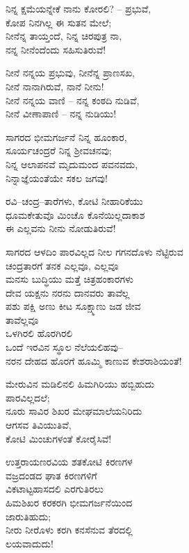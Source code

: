 ನಿನ್ನ ಕ್ಷಮೆಯನ್ನೇಕೆ ನಾನು ಕೋರಲಿ? – ಪ್ರಭುವೆ,\\ಕೋಪ ನಿನಗಿಲ್ಲ ಈ ಸುತನ ಮೇಲೆ;\\ನೀನೆನ್ನ ತಾಯ್ತಂದೆ, ನಿನ್ನ ಚಿರಪುತ್ರ ನಾ,\\ನನ್ನ ನೀನೆಂದೆಂದು ಸಹಿಸುತಿರುವೆ!

ನೀನೆ ನನ್ನಯ ಪ್ರಭುವು, ನೀನೆನ್ನ ಪ್ರಾಣಸಖ,\\ನೀನೆ ನಾನಾಗಿರುವೆ, ನಾನೆ ನೀನು!\\ನೀನೆ ನನ್ನಯ ವಾಣಿ – ನನ್ನ ಕಂಠದಿ ನುಡಿವೆ,\\ನೀನೆ ವೀಣಾಪಾಣಿ – ನನ್ನ ನುಡಿಯು!

ಸಾಗರದ ಭೀಮಗರ್ಜನೆ ನಿನ್ನ ಹೂಂಕಾರ,\\ಸೂರ್ಯಚಂದ್ರರೆ ನಿನ್ನ ಶ‍್ರೀವಚನವು;\\ನಿನ್ನ ಆಲಾಪನವೆ ಮೃದುಮಂದ ಪವನವದು,\\ನಿನ್ನಾಜ್ಞೆಯಂತೆಯೇ ಸಕಲ ಜಗವು!

ರವಿ–ಚಂದ್ರ–ತಾರೆಗಳು, ಕೋಟಿ ನೀಹಾರಿಕೆಯು\\ಧೂಮಕೇತುವೊ ಮಿಂಚೊ ಕೊನೆಯಿಲ್ಲದಾಕಾಶ\\ಈ ಎಲ್ಲವನು ನೀನು ನೋಡುತಿರುವೆ!

ಸಾಗರದ ಆಳದಿಂ ಪಾರವಿಲ್ಲದ ನೀಲ ಗಗನದೊಳು ನೆಟ್ಟಿರುವ\\ಚಂದ್ರತಾರಗೆ ತನಕ ಎಲ್ಲವೂ, ಎಲ್ಲವೂ\\ಮನಸು ಬುದ್ಧಿಯು ಮತ್ತೆ ಚಿತ್ರಹಂಕಾರಗಳು\\ದೇವ ಯಕ್ಷನು ನರನು ದಾನವರು ತಾವೆಲ್ಲ\\ಪಶು ಪಕ್ಷಿ ಅಣು ಕೀಟ ಸೂಕ್ಷ್ಮಾಣು ಜಡ ಜೀವ\\ತಾವೆಲ್ಲವೂ\\ಒಳಗಿರಲಿ ಹೊರಗಿರಲಿ\\ಒಂದೆ ಇರವಿನ ಸ್ಥೂಲ ನೆಲೆಯಲಿಹವು–\\ನರನ ದೇಹದ ಹೊರಗೆ ಹೂಮ್ಮಿ ಕಾಣುವ ಕೇಶರಾಶಿಯಂತೆ!

ಮೇರುವಿನ ಮಡಿಲಿನಲಿ ಹಿಮಗಿರಿಯು ಹಬ್ಬಿಹುದು\\ಪಾರವಿಲ್ಲದಲೆ;\\ನೂರು ಸಾವಿರ ಶಿಖರ ಮೇಘಮಾಲೆಯನಿರಿದು\\ಆಗಸವ ತಿವಿಯುತಿವೆ,\\ಕೋಟಿ ಮಿಂಚುಗಳಂತೆ ಕೋರೈಸಿವೆ!

ಉತ್ತರಾಯಣರವಿಯ ಶತಕೋಟಿ ಕಿರಣಗಳ\\ವಜ್ರದಂಡದ ಘಾತ ಕಿರಣಗಳಿಗೆ\\ವಿಕಟಾಟ್ಟಹಾಸದಲಿ ಎರಗುತಿರಲು\\ಹಿಮಶಿಖರ ಕರಕರಗಿ ಭೀಮಗರ್ಜನೆಯಿಂದ\\ಜಾರುತಿಹುದು;\\ನೀರು ನೀರೊಳು ಕರಗಿ ಕನಸೆನುವ ತೆರದಲ್ಲಿ\\ಲಯವಾದುದು!

